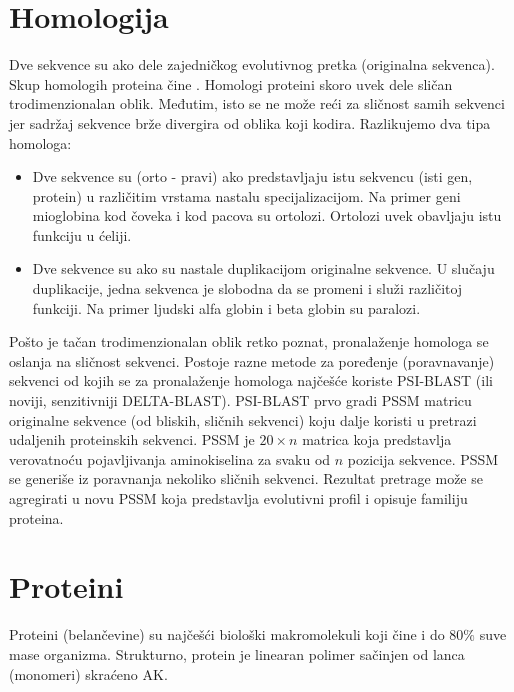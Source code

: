 \section{Homologija}

Dve sekvence su  ako dele zajedničkog evolutivnog pretka
(originalna sekvenca). Skup homologih proteina čine . Homologi proteini skoro uvek dele sličan trodimenzionalan oblik.
Međutim, isto se ne može reći za sličnost samih sekvenci jer sadržaj sekvence
brže divergira od oblika koji kodira. Razlikujemo dva tipa homologa:
\begin{itemize}
  \item
    Dve sekvence su  (orto - pravi) ako predstavljaju istu
    sekvencu (isti gen, protein) u različitim vrstama nastalu specijalizacijom.
    Na primer geni mioglobina kod čoveka i kod pacova su ortolozi. Ortolozi
    uvek obavljaju istu funkciju u ćeliji.

  \item Dve sekvence su  ako su nastale duplikacijom
    originalne sekvence. U slučaju duplikacije, jedna sekvenca je slobodna
    da se promeni i služi različitoj funkciji. Na primer ljudski
    alfa globin i beta globin su paralozi.
\end{itemize}

Pošto je tačan trodimenzionalan oblik retko poznat, pronalaženje homologa
se oslanja na sličnost sekvenci. Postoje razne metode za poređenje
(poravnavanje) sekvenci od kojih se za pronalaženje homologa najčešće koriste
PSI-BLAST (ili noviji, senzitivniji DELTA-BLAST).  PSI-BLAST  prvo gradi PSSM matricu
originalne sekvence (od bliskih, sličnih sekvenci) koju dalje koristi u pretrazi
udaljenih proteinskih sekvenci. PSSM  je
$20 \times n$ matrica koja predstavlja verovatnoću pojavljivanja aminokiselina
za svaku od $n$ pozicija sekvence. PSSM se generiše iz poravnanja nekoliko
sličnih sekvenci. Rezultat pretrage može se agregirati u novu PSSM koja
predstavlja evolutivni profil i opisuje familiju proteina. 

\label{sec:}
\section{Proteini}

Proteini (belančevine) su najčešći biološki makromolekuli koji čine i do $80\%$
suve mase organizma.  Strukturno, protein je linearan polimer sačinjen od lanca
 (monomeri) skraćeno AK.

